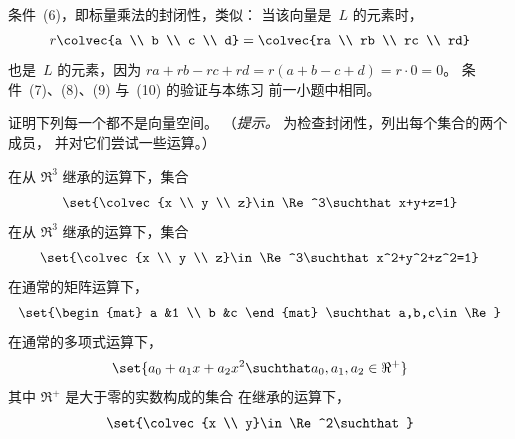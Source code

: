 \begin{exercises}
\begin{answer}
\begin{exparts}
          条件~(6)，即标量乘法的封闭性，类似：
          当该向量是~$L$ 的元素时，
          \begin{equation*}
            r\colvec{a  \\ b \\ c \\ d}
            =\colvec{ra  \\  rb  \\  rc  \\  rd}
          \end{equation*}
          也是~$L$ 的元素，因为 $ra+rb-rc+rd=r(a+b-c+d)=r\cdot 0=0$。
          条件~(7)、(8)、(9) 与~(10) 的验证与本练习
          前一小题中相同。
     \end{exparts}
     \end{answer}
  \recommended \item \label{exer:NotVectorSpaces}
    证明下列每一个都不是向量空间。
    （\textit{提示。}  为检查封闭性，列出每个集合的两个成员，
    并对它们尝试一些运算。）
    \begin{exparts}
      \partsitem 在从 \( \Re^3 \) 继承的运算下，集合
        \begin{equation*}
          \set{\colvec{x \\ y \\ z}\in\Re^3\suchthat x+y+z=1}
        \end{equation*}
      \partsitem 在从 \( \Re^3 \) 继承的运算下，集合
        \begin{equation*}
          \set{\colvec{x \\ y \\ z}\in\Re^3\suchthat x^2+y^2+z^2=1}
        \end{equation*}
      \partsitem 在通常的矩阵运算下，
        \begin{equation*}
          \set{\begin{mat}
                 a  &1  \\
                 b  &c
               \end{mat} \suchthat a,b,c\in\Re}
        \end{equation*}
      \partsitem 在通常的多项式运算下，
        \begin{equation*}
          \set{a_0+a_1x+a_2x^2\suchthat a_0,a_1,a_2\in\Re^+}
        \end{equation*}
        其中 $\Re^+$ 是大于零的实数构成的集合
      \partsitem 在继承的运算下，
        \begin{equation*}
          \set{\colvec{x \\ y}\in\Re^2\suchthat
}
\end{equation*}
\end{exparts}
\end{exercises}

